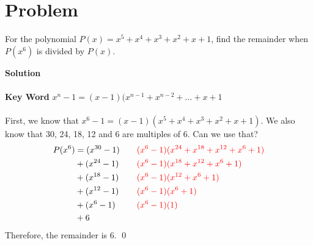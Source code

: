 \documentclass{article}
\newenvironment{solution}{\begin{trivlist}\item[]{\bf Solution}}{\qed \end{trivlist}}
\begin{document}
\newpage
\section*{Problem}
For the polynomial $P(x) = x^5 + x^4 + x^3 + x^2 + x + 1$, find the remainder when $P(x^6)$ is divided by $P(x)$.
\begin{solution}
\\\\
\textbf{Key Word} $x^n - 1 = (x - 1)(x^{n-1} + x^{n-2} + \dots + x + 1$
\\\\
First, we know that $x^6 - 1 = (x - 1)(x^5 + x^4 + x^3 + x^2 + x + 1)$. We also know that 30, 24, 18, 12 and 6 are multiples of 6. Can we use that?
\begin{align*}
    P(x^6)
    &= (x^{30} - 1) \quad
        &&\textcolor{red}{(x^6 - 1)(x^{24} + x^{18} + x^{12} + x^{6} + 1)} \\
    &+ (x^{24} - 1) \quad
        &&\textcolor{red}{(x^6 - 1)(x^{18} + x^{12} + x^{6} + 1)} \\
    &+ (x^{18} - 1) \quad
        &&\textcolor{red}{(x^6 - 1)(x^{12} + x^{6} + 1)} \\
    &+ (x^{12} - 1) \quad
        &&\textcolor{red}{(x^6 - 1)(x^{6} + 1)} \\
    &+ (x^{6} - 1) \quad
        &&\textcolor{red}{(x^6 - 1)(1)} \\
    &+ 6
\end{align*}
Therefore, the remainder is $\boxed{6}$.
\end{solution}
\end{document}
